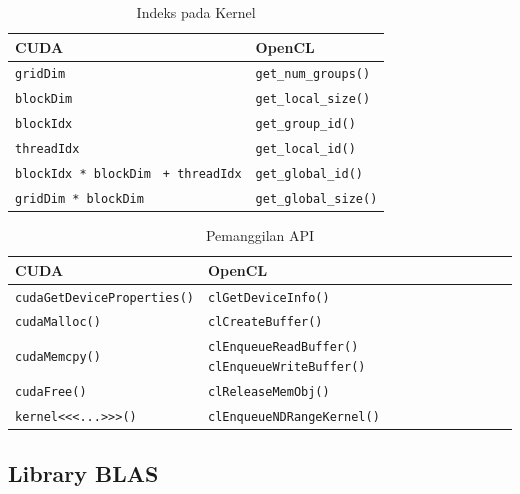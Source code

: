 \begin{table}
	\centering
	\caption{Indeks pada Kernel}
	\label{tab:indeks_pada_kernel}
	\begin{tabular}{|C{6cm}|C{6cm}|}
		 \hline \rule[-2ex]{0pt}{5.5ex} CUDA & OpenCL \\ 
		\hline \rule[-2ex]{0pt}{5.5ex} \verb|gridDim|​ & \verb|get_num_groups()| \\ 
		\hline \rule[-2ex]{0pt}{5.5ex} \verb|blockDim| & \verb|get_local_size()​| \\ 
		\hline \rule[-2ex]{0pt}{5.5ex} \verb|blockIdx|​ & \verb|get_group_id()| \\ 
		\hline \rule[-2ex]{0pt}{5.5ex} \verb|threadIdx| & \verb|get_local_id()| \\ 
		\hline \rule[-2ex]{0pt}{5.5ex} \verb|blockIdx * blockDim| \newline \verb| + threadIdx| & \verb|get_global_id()| \\ 
		\hline \rule[-2ex]{0pt}{5.5ex} \verb|gridDim * blockDim| & \verb|get_global_size()| \\ 		
		\hline 
	\end{tabular} 
\end{table}

\begin{table}
	\centering
	\caption{Pemanggilan API}
	\label{tab:pemanggilan_api}
	\begin{tabular}{|C{6cm}|C{6cm}|}
		 \hline \rule[-2ex]{0pt}{5.5ex} CUDA & OpenCL \\ 
		\hline \rule[-2ex]{0pt}{5.5ex} \verb|cudaGetDeviceProperties()|​ & \verb|clGetDeviceInfo()| \\ 
		\hline \rule[-2ex]{0pt}{5.5ex} \verb|cudaMalloc()| & \verb|clCreateBuffer()| \\ 
		\hline \rule[-2ex]{0pt}{5.5ex} \verb|cudaMemcpy()|​ & \verb|clEnqueueReadBuffer()| \newline \verb|clEnqueueWriteBuffer()| \\ 
		\hline \rule[-2ex]{0pt}{5.5ex} \verb|cudaFree()| & \verb|clReleaseMemObj()| \\ 
		\hline \rule[-2ex]{0pt}{5.5ex} \verb|kernel<<<...>>>()| & \verb|clEnqueueNDRangeKernel()| \\ 
		\hline 
	\end{tabular} 
\end{table}

\subsection{Library BLAS}

